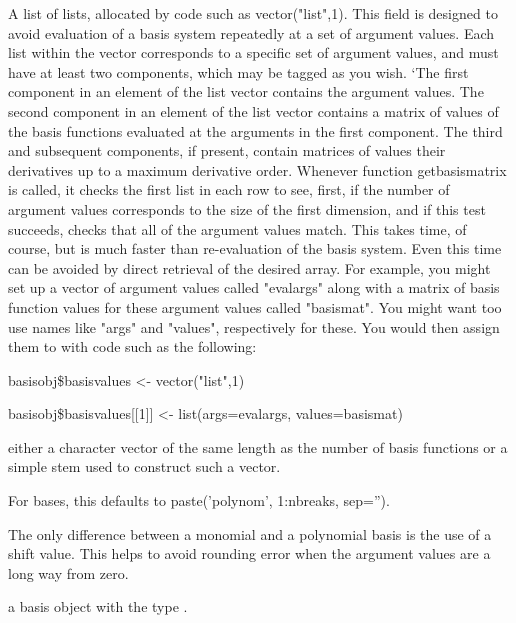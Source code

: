 \documentclass{article}
\begin{document}
\begin{Arguments}
\begin{ldescription}
\item[\code{basisvalues}] A list of lists, allocated by code such as vector("list",1).  This
field is designed to avoid evaluation of a basis system repeatedly
at a set of argument values.  Each list within the vector
corresponds to a specific set of argument values, and must have at
least two components, which may be tagged as you wish.  `The first
component in an element of the list vector contains the argument
values.  The second component in an element of the list vector
contains a matrix of values of the basis functions evaluated at the
arguments in the first component.  The third and subsequent
components, if present, contain matrices of values their derivatives
up to a maximum derivative order.  Whenever function getbasismatrix
is called, it checks the first list in each row to see, first, if
the number of argument values corresponds to the size of the first
dimension, and if this test succeeds, checks that all of the
argument values match.  This takes time, of course, but is much
faster than re-evaluation of the basis system.  Even this time can
be avoided by direct retrieval of the desired array.  For example,
you might set up a vector of argument values called "evalargs" along
with a matrix of basis function values for these argument values
called "basismat".  You might want too use names like "args" and
"values", respectively for these.  You would then assign them to
 with code such as the following:

basisobj\$basisvalues <- vector("list",1)

basisobj\$basisvalues[[1]] <- list(args=evalargs,
values=basismat)

\item[\code{names}] either a character vector of the same length as the number of basis
functions or a simple stem used to construct such a vector.

For  bases, this defaults to paste('polynom',
1:nbreaks, sep='').

\end{ldescription}
\end{Arguments}
\begin{Details}\relax
The only difference between a monomial and a polynomial basis
is the use of a shift value.  This helps to avoid rounding error
when the argument values are a long way from zero.
\end{Details}
\begin{Value}
a basis object with the type .
\end{Value}
\end{document}
